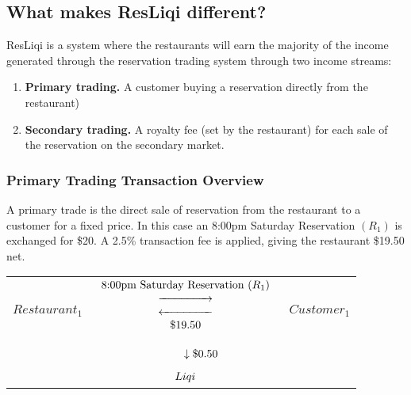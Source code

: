 \documentclass{article}
\begin{document}
	\subsection{What makes ResLiqi different?}
	\hspace{1cm} ResLiqi is a system where the restaurants will earn the majority of the income generated through the reservation trading system through two income streams:
		\begin{enumerate}[label=\textbf{\Roman*}.]
			\item \textbf{Primary trading.}  A customer buying a reservation directly from the restaurant)
			\item \textbf{Secondary trading.}  A royalty fee (set by the restaurant) for each sale of the reservation on the secondary market.
		\end{enumerate}
	\subsubsection{Primary Trading Transaction Overview}
	\hspace{1cm}A primary trade is the direct sale of reservation from the restaurant to a customer for a fixed price.  In this case an 8:00pm Saturday Reservation $(R_{1})$ is exchanged for \$20.  A 2.5\% transaction fee is applied, giving the restaurant \$19.50 net.
	\begin{center}
\begin{tabular}{l c r}
	$Restaurant_{1}$& 
	$\begin{array}{c}
		\text{8:00pm Saturday Reservation } (R_{1}) \\
		\xrightarrow{\hspace*{1.5cm}} \\
		\xleftarrow{\hspace*{1.5cm}} \\
		\text{\$19.50}
			\vspace*{0.3cm}
	\end{array}$ & 
	$Customer_{1}$ \\
	\vspace*{0.3cm}
	& $\begin{array}{c}
   	\hspace*{1cm}\vspace*{0.3cm} \downarrow \text{\$0.50} \\
	Liqi\\
	\end{array}$ &
\end{tabular}
	\end{center}
\end{document}
